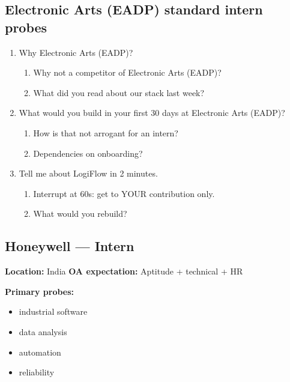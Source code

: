 \documentclass[9pt,a4paper]{article}
\begin{document}
\subsection{Electronic Arts (EADP) standard intern probes}
\begin{enumerate}[label=\textbf{Q\arabic*:}, leftmargin=*]
  \item Why Electronic Arts (EADP)?
  \begin{enumerate}[label=\textit{FU\arabic*:}, leftmargin=2em]
    \item Why not a competitor of Electronic Arts (EADP)?
    \item What did you read about our stack last week?
  \end{enumerate}
  \item What would you build in your first 30 days at Electronic Arts (EADP)?
  \begin{enumerate}[label=\textit{FU\arabic*:}, leftmargin=2em]
    \item How is that not arrogant for an intern?
    \item Dependencies on onboarding?
  \end{enumerate}
  \item Tell me about LogiFlow in 2 minutes.
  \begin{enumerate}[label=\textit{FU\arabic*:}, leftmargin=2em]
    \item Interrupt at 60s: get to YOUR contribution only.
    \item What would you rebuild?
  \end{enumerate}
\end{enumerate}
\newpage
\subsection{Honeywell --- Intern}
\textbf{Location:} India \quad \textbf{OA expectation:} Aptitude + technical + HR

\textbf{Primary probes:}
\begin{itemize}
  \item industrial software
  \item data analysis
  \item automation
  \item reliability
\end{itemize}
\end{document}
